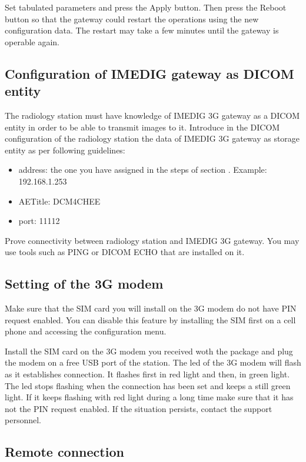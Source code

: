 \documentclass{plantilla-manual-usuario-en}
\begin{document}
Set tabulated parameters and press the Apply button. Then press the Reboot button so that the gateway could restart the operations using the new configuration data. The restart may take a few minutes until the gateway is operable again.

\subsection{Configuration of IMEDIG gateway as DICOM entity}

The radiology station must have knowledge of IMEDIG 3G gateway as a DICOM entity in order to be able to transmit images to it. Introduce in the DICOM configuration of the radiology station the data of IMEDIG 3G gateway as storage entity as per following guidelines:

\begin{itemize}
\item address: the one you have assigned in the steps of section . Example: 192.168.1.253
\item AETitle: DCM4CHEE
\item port: 11112
\end{itemize}

Prove connectivity between radiology station and IMEDIG 3G gateway. You may use tools such as PING or DICOM ECHO that are installed on it.

\subsection{Setting of the 3G modem}

Make sure that the SIM card you will install on the 3G modem do not have PIN request enabled. You can disable this feature by installing the SIM first on a cell phone and accessing the configuration menu.

Install the SIM card on the 3G modem you received woth the package and plug the modem  on a free USB port of the station. The led of the 3G modem will flash as it establishes connection. It flashes first in red light and then, in green light. The led stops flashing when the connection has been set  and keeps a still green light. If it keeps flashing with red light during a long time make sure that it has not the PIN request enabled. If the situation persists, contact the support personnel. 

\subsection{Remote connection}
\end{document}
